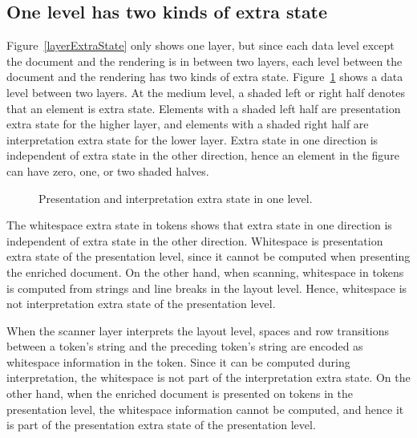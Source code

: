 %																
\subsection{One level has two kinds of extra state} \label{sect:oneLevelDoubleES}

Figure~\ref{layerExtraState} only shows one layer, but since each data level except the document and the rendering is in between two layers, each level between the document and the rendering has two kinds of extra state. Figure~\ref{levelExtraState} shows a data level between two layers. At the medium level, a shaded left or right half denotes that an element is extra state. Elements with a shaded left half are presentation extra state for the higher layer, and elements with a shaded right half are interpretation extra state for the lower layer. Extra state in one direction is independent of extra state in the other direction, hence an element in the figure can have zero, one, or two shaded halves.

\begin{figure}
\begin{center}
\begin{center}
\end{center}
\caption{Presentation and interpretation extra state in one level.}\label{levelExtraState} 
\end{center}
\end{figure}

The whitespace extra state in tokens shows that extra state in one direction is independent of extra state in the other direction. Whitespace is presentation extra state of the presentation level, since it cannot be computed when presenting the enriched document. On the other hand, when scanning, whitespace in tokens is computed from strings and line breaks in the layout level. Hence, whitespace is not interpretation extra state of the presentation level.



\bc
When the scanner layer interprets the layout level, spaces and row transitions between a token's string and the preceding token's string are encoded as whitespace information in the token. Since it can be computed during interpretation, the whitespace is not part of the interpretation extra state. On the other hand, when the enriched document is presented on tokens in the presentation level, the whitespace information cannot be computed, and hence it is part of the presentation extra state of the presentation level.
\ec

